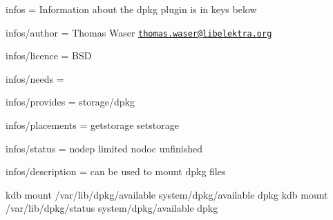 
\begin{DoxyItemize}
\item infos = Information about the dpkg plugin is in keys below
\item infos/author = Thomas Waser \href{mailto:thomas.waser@libelektra.org}{\tt thomas.\+waser@libelektra.\+org}
\item infos/licence = B\+SD
\item infos/needs =
\item infos/provides = storage/dpkg
\item infos/placements = getstorage setstorage
\item infos/status = nodep limited nodoc unfinished
\item infos/description = can be used to mount dpkg files
\end{DoxyItemize}


\begin{DoxyCode}
kdb mount /var/lib/dpkg/available system/dpkg/available dpkg
kdb mount /var/lib/dpkg/status system/dpkg/available dpkg
\end{DoxyCode}
 